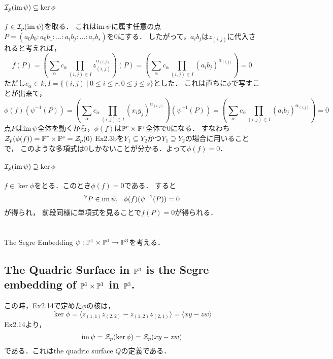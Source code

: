\documentclass[a4paper]{jsarticle}
\begin{document}
    \paragraph{$\mathcal{I}_p(\operatorname{im} \psi) \subseteq \ker \phi$}
    $f \in \mathcal{I}_p(\operatorname{im} \psi)$を取る．
    これは$\operatorname{im} \psi$に属す任意の点$P=(a_0 b_0: a_0 b_1: \dots: a_i b_j: \dots: a_r b_s)$を0にする．
    したがって，$a_i b_j$は$z_{(i,j)}$に代入されると考えれば，
    \[
        f(P)
        =\left( \sum_{\alpha}{c_{\alpha} \prod_{(i,j) \in I}{z_{(i,j)}^{\alpha_{(i,j)}}}} \right)(P)
        =\left( \sum_{\alpha}{c_{\alpha} \prod_{(i,j) \in I}{(a_i b_j)^{\alpha_{(i,j)}}}} \right)
        =0
    \]
    ただし$c_{\alpha} \in k, I=\{(i,j) ~|~ 0 \leq i \leq r, 0 \leq j \leq s\}$とした．
    これは直ちに$\phi$で写すことが出来て，
    \[
        \phi(f)(\psi^{-1}(P))
        =\left( \sum_{\alpha}{c_{\alpha} \prod_{(i,j) \in I}{(x_i y_j)^{\alpha_{(i,j)}}}} \right)(\psi^{-1}(P))
        =\left( \sum_{\alpha}{c_{\alpha} \prod_{(i,j) \in I}{(a_i b_j)^{\alpha_{(i,j)}}}} \right)
        =0
    \]
    点$P$は$\operatorname{im} \psi$全体を動くから，$\phi(f)$は$\mathbb{P}^r \times \mathbb{P}^s$全体で0になる．
    すなわち$\mathcal{Z}_p(\phi(f))=\mathbb{P}^r \times \mathbb{P}^s=\mathcal{Z}_p(0)$
    Ex2.3bを$Y_1 \subseteq Y_2$かつ$Y_1 \supseteq Y_2$の場合に用いることで，
    このような多項式は0しかないことが分かる．よって$\phi(f)=0$．

    \paragraph{$\mathcal{I}_p(\operatorname{im} \psi) \supseteq \ker \phi$}
    $f \in \ker \phi$をとる．このとき$\phi(f)=0$である．
    すると\[ {}^{\forall} P \in \operatorname{im} \psi,~~ \phi(f)(\psi^{-1}(P))=0 \]が得られ，
    前段同様に単項式を見ることで$f(P)=0$が得られる．

\section{ } %
    The Segre Embedding $\psi: \mathbb{P}^1 \times \mathbb{P}^1 \to \mathbb{P}^3$を考える．

    \subsection{The Quadric Surface in $\mathbb{P}^3$ is the Segre embedding of $\mathbb{P}^1 \times \mathbb{P}^1$ in $\mathbb{P}^3$.}
    この時，Ex2.14で定めた$\phi$の核は，
    \[ \ker \phi=\langle z_{(1,1)}z_{(2,2)}-z_{(1,2)}z_{(2,1)} \rangle=\langle xy-zw \rangle \]
    Ex2.14より，
    \[ \operatorname{im} \psi=\mathcal{Z}_p(\ker \phi)=\mathcal{Z}_p(xy-zw) \]
    である．これはthe quadric surface $Q$の定義である．
\end{document}
